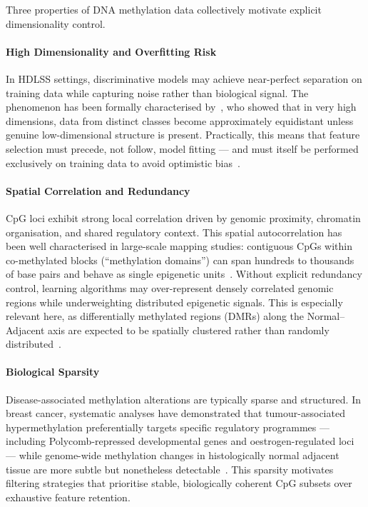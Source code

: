 Three properties of DNA methylation data collectively motivate explicit 
dimensionality control.

\paragraph{High Dimensionality and Overfitting Risk}
In HDLSS settings, discriminative models may achieve near-perfect separation 
on training data while capturing noise rather than biological signal. The 
phenomenon has been formally characterised by~\cite{Hall2005}, who showed 
that in very high dimensions, data from distinct classes become approximately 
equidistant unless genuine low-dimensional structure is present. Practically, 
this means that feature selection must precede, not follow, model fitting — 
and must itself be performed exclusively on training data to avoid 
optimistic bias~\cite{Ambroise2002}.

\paragraph{Spatial Correlation and Redundancy}
CpG loci exhibit strong local correlation driven by genomic proximity, 
chromatin organisation, and shared regulatory context. This spatial 
autocorrelation has been well characterised in large-scale mapping studies: 
contiguous CpGs within co-methylated blocks (``methylation domains'') 
can span hundreds to thousands of base pairs and behave as single 
epigenetic units~\cite{Hansen2011, Aryee2014}. Without explicit redundancy 
control, learning algorithms may over-represent densely correlated genomic 
regions while underweighting distributed epigenetic signals. This is 
especially relevant here, as differentially methylated regions (DMRs) 
along the Normal–Adjacent axis are expected to be spatially clustered 
rather than randomly distributed~\cite{Luo2018}.

\paragraph{Biological Sparsity}
Disease-associated methylation alterations are typically sparse and 
structured. In breast cancer, systematic analyses have demonstrated that 
tumour-associated hypermethylation preferentially targets specific regulatory 
programmes — including Polycomb-repressed developmental genes and 
oestrogen-regulated loci — while genome-wide methylation changes in 
histologically normal adjacent tissue are more subtle but nonetheless 
detectable~\cite{Teschendorff2016fielddefects, Fleischer2017}. This sparsity 
motivates filtering strategies that prioritise stable, biologically 
coherent CpG subsets over exhaustive feature retention.

